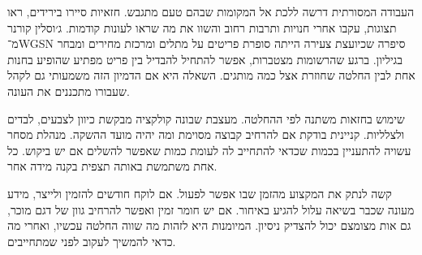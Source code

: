 

\vspace{6mm}

{\fontsize{16}{25}\selectfont

העבודה המסורתית דרשה ללכת אל המקומות שבהם טעם מתגבש. חזאיות סיירו בירידים, ראו תצוגות, עקבו אחרי חנויות ותרבות רחוב והשוו את מה שראו לעונות קודמות. ג׳וסלין קורנר מ־\textenglish{WGSN} סיפרה שכיועצת צעירה הייתה סופרת פריטים על מתלים ומרכזת מחירים ומבחר בגיליון. ברגע שהרשומות מצטברות, אפשר להתחיל להבדיל בין פריט מפתיע שהופיע בחנות אחת לבין החלטה שחוזרת אצל כמה מותגים. השאלה היא אם הדמיון הזה משמעותי גם לקהל שעבורו מתכננים את העונה. 

שימוש בחזאות משתנה לפי ההחלטה. מעצבת שבונה קולקציה מבקשת כיוון לצבעים, לבדים ולצלליות. קניינית בודקת אם להרחיב קבוצה מסוימת ומה יהיה מועד ההשקה. מנהלת מסחר עשויה להתעניין בכמות שכדאי להתחייב לה לעומת כמות שאפשר להשלים אם יש ביקוש. כל אחת משתמשת באותה תצפית בקנה מידה אחר. 

קשה לנתק את המקצוע מהזמן שבו אפשר לפעול. אם לוקח חודשים להזמין ולייצר, מידע מעונה שכבר בשיאה עלול להגיע באיחור. אם יש חומר זמין ואפשר להרחיב גוון של דגם מוכר, גם אות מצומצם יכול להצדיק ניסיון. המיומנות היא לזהות מה שווה החלטה עכשיו, ואחרי מה כדאי להמשיך לעקוב לפני שמתחייבים.

\par}
